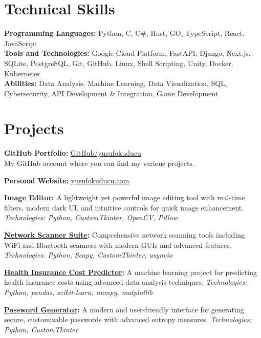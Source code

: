 \documentclass[10pt,a4paper]{extarticle}
\begin{document}
\section{Technical Skills}
\textbf{Programming Languages:} Python, C, C\#, Rust, GO, TypeScript, React, JavaScript\\
\textbf{Tools and Technologies:} Google Cloud Platform, FastAPI, Django, Next.js, SQLite, PostgreSQL, Git, GitHub, Linux, Shell Scripting, Unity, Docker, Kubernetes\\
\textbf{Abilities:} Data Analysis, Machine Learning, Data Visualization, SQL, Cybersecurity, API Development \& Integration, Game Development

\vspace{10pt}

\section{Projects}
\textbf{GitHub Portfolio:} \href{https://github.com/yusufokuducu}{GitHub/yusufokuducu}\\
My GitHub account where you can find my various projects.

\vspace{5pt}
\noindent\textbf{Personal Website:} \href{https://yusufokuducu.com}{yusufokuducu.com}

\vspace{5pt}
\noindent\textbf{\href{https://github.com/yusufokuducu/Image_Editor}{Image Editor}:} A lightweight yet powerful image editing tool with real-time filters, modern dark UI, and intuitive controls for quick image enhancement. \textit{Technologies: Python, CustomTkinter, OpenCV, Pillow}

\vspace{5pt}
\noindent\textbf{\href{https://github.com/yusufokuducu/Wifi-Scanner}{Network Scanner Suite}:} Comprehensive network scanning tools including WiFi and Bluetooth scanners with modern GUIs and advanced features. \textit{Technologies: Python, Scapy, CustomTkinter, asyncio}

\vspace{5pt}
\noindent\textbf{\href{https://github.com/yusufokuducu/GlobalAIHub_MCA}{Health Insurance Cost Predictor}:} A machine learning project for predicting health insurance costs using advanced data analysis techniques. \textit{Technologies: Python, pandas, scikit-learn, numpy, matplotlib}

\vspace{5pt}
\noindent\textbf{\href{https://github.com/yusufokuducu/Password_Generator}{Password Generator}:} A modern and user-friendly interface for generating secure, customizable passwords with advanced entropy measures. \textit{Technologies: Python, CustomTkinter}
\end{document}
